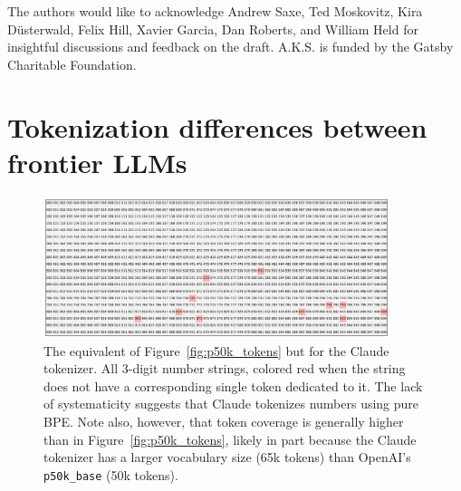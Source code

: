 \documentclass{article}
\theoremstyle{plain}
\theoremstyle{definition}
\theoremstyle{remark}
\begin{document}
The authors would like to acknowledge Andrew Saxe, Ted Moskovitz, Kira Düsterwald, Felix Hill, Xavier Garcia, Dan Roberts, and William Held for insightful discussions and feedback on the draft. A.K.S. is funded by the Gatsby Charitable Foundation.

\nocite{touvron2023llama2}





\newpage
\appendix
\onecolumn

\section{Tokenization differences between frontier LLMs}
\label{appx:llm_tokenization_schemes}

\begin{figure}[H]
    \centering
    \includegraphics[width=0.9\textwidth]{figures/anthropic_3digit_tokens_no_ws_20rows.pdf}
    \caption{The equivalent of Figure~\ref{fig:p50k_tokens} but for the Claude tokenizer. All 3-digit number strings, colored red when the string does not have a corresponding single token dedicated to it. The lack of systematicity suggests that Claude tokenizes numbers using pure BPE. Note also, however, that token coverage is generally higher than in Figure~\ref{fig:p50k_tokens}, likely in part because the Claude tokenizer has a larger vocabulary size (65k tokens) than OpenAI's \texttt{p50k\_base} (50k tokens).}
    \label{fig:claude_token_coverage}
\end{figure}
\end{document}
